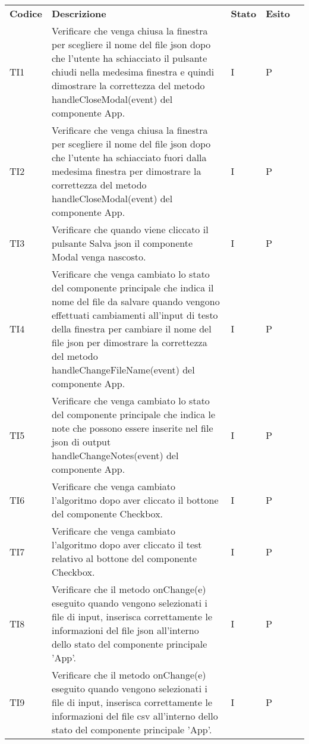 \begin{longtable} {
		>{}p{15mm} 
		>{}p{79.5mm}
		>{}p{15mm} 
		>{}p{15mm}
		>{}p{0mm}}
	\rowcolor{gray!50}
	\textbf{Codice} & \textbf{Descrizione} & \textbf{Stato} & \textbf{Esito} &\TBstrut \\
	TI1      &  Verificare che venga chiusa la finestra per scegliere il nome del file json dopo che l’utente ha schiacciato il pulsante chiudi nella medesima finestra e quindi dimostrare la correttezza del metodo handleCloseModal(event) del componente App.& I & P  &\TBstrut \\ [2mm]
	TI2      &  Verificare che venga chiusa la finestra per scegliere il nome del file json dopo che l’utente ha schiacciato fuori dalla medesima finestra per dimostrare la correttezza del metodo handleCloseModal(event) del componente App.& I & P  &\TBstrut \\ [2mm]
	TI3      &  Verificare che quando viene cliccato il pulsante Salva json il componente Modal venga nascosto.& I & P  &\TBstrut \\ [2mm]
	TI4      &  Verificare che venga cambiato lo stato del componente principale che indica il nome del file da salvare quando vengono effettuati cambiamenti all'input di testo della finestra per cambiare il nome del file json per dimostrare la correttezza del metodo handleChangeFileName(event) del componente App.& I & P  &\TBstrut \\ [2mm]
	TI5      &  Verificare che venga cambiato lo stato del componente principale che indica le note che possono essere inserite nel file json di output handleChangeNotes(event) del componente App.& I & P  &\TBstrut \\ [2mm]
	TI6      &  Verificare che venga cambiato l'algoritmo dopo aver cliccato il bottone del componente Checkbox.& I & P  &\TBstrut \\ [2mm]
	TI7      &  Verificare che venga cambiato l'algoritmo dopo aver cliccato il test relativo al bottone del componente Checkbox.& I & P  &\TBstrut \\ [2mm]
	TI8      &  Verificare che il metodo onChange(e) eseguito quando vengono selezionati i file di input, inserisca correttamente le informazioni del file json all'interno dello stato del componente principale 'App'.& I & P  &\TBstrut \\ [2mm]
	TI9      &  Verificare che il metodo onChange(e) eseguito quando vengono selezionati i file di input, inserisca correttamente le informazioni del file csv all'interno dello stato del componente principale 'App'.& I & P  &\TBstrut \\ [2mm]

\end{longtable}
